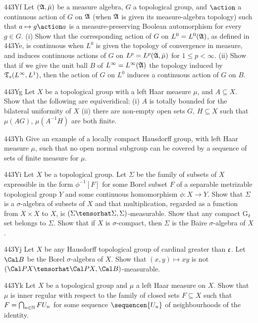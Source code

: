 {\spheader 443Yf Let $(\frak A,\bar\mu)$ be a measure algebra,
$G$ a topological group, and
$\action$ a continuous action of $G$ on $\frak A$ (when $\frak A$ is
given its measure-algebra topology) such that $a\mapsto g\action a$ is
a measure-preserving Boolean automorphism for every $g\in G$.
(i) Show that the corresponding action of $G$ on $L^0=L^0(\frak A)$, as
defined in
443Ye, is continuous when $L^0$ is given the topology of convergence in
measure, and induces continuous actions of $G$ on
$L^p=L^p(\frak A,\bar\mu)$ for $1\le p<\infty$.
(ii) Show that if we give the
unit ball $B$ of $L^{\infty}=L^{\infty}(\frak A)$ the topology induced by
$\frak T_s(L^{\infty},L^1)$, then the action of $G$ on $L^0$ induces a
continuous action of $G$ on $B$.

\spheader 443Yg Let $X$ be a topological group with a left Haar measure
$\mu$, and $A\subseteq X$.   Show that the following are equiveridical:
(i) $A$ is totally bounded for the bilateral uniformity of $X$ (ii)
there are non-empty open sets $G$, $H\subseteq X$ such that $\mu(AG)$,
$\mu(A^{-1}H)$ are both finite.

\spheader 443Yh
Give an example of a locally compact Hausdorff group, with left Haar
measure $\mu$, such that no open normal subgroup can be covered by a
sequence of sets of finite measure for $\mu$.

\spheader 443Yi Let $X$ be a topological group.   Let $\Sigma$ be the
family of subsets of $X$ expressible in the form $\phi^{-1}[F]$ for some
Borel subset $F$ of a separable metrizable topological group $Y$ and
some continuous homomorphism $\phi:X\to Y$.   Show that $\Sigma$ is a
$\sigma$-algebra of subsets of $X$ and that multiplication, regarded as
a function from $X\times X$ to $X$, is
$(\Sigma\tensorhat\Sigma,\Sigma)$-measurable.   Show that any compact
G$_{\delta}$ set belongs to $\Sigma$.   Show that if $X$ is
$\sigma$-compact, then $\Sigma$ is the Baire $\sigma$-algebra of $X$.

\spheader 443Yj Let $X$ be any Hausdorff topological group of cardinal
greater than $\frak c$.   Let $\Cal B$ be the Borel $\sigma$-algebra of
$X$.   Show that $(x,y)\mapsto xy$ is not
$(\Cal PX\tensorhat\Cal PX,\Cal B)$-measurable.

\spheader 443Yk Let $X$ be a topological group and $\mu$ a left Haar
measure on $X$.   Show that $\mu$ is inner regular with respect to the
family of closed sets $F\subseteq X$ such that
$F=\bigcap_{n\in\Bbb N}FU_n$ for some sequence $\sequencen{U_n}$ of
neighbourhoods of the identity.   

}
